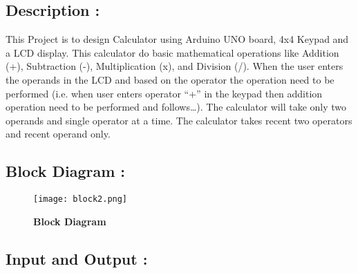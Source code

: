 \documentclass[12pt]{article}
\begin{document}
\subsection*{\textbf{Description :}}
 
 This Project is to design Calculator using Arduino UNO board, 4x4 Keypad and a LCD display. This calculator do basic mathematical operations like Addition (+), Subtraction (-), Multiplication (x), and Division (/). When the user enters the operands in the LCD and based on the operator the operation need to be performed (i.e. when user enters operator “+” in the keypad then addition operation need to be performed and follows…). The calculator will take only two operands and single operator at a time. The calculator takes recent two operators and recent operand only.

 
 \subsection*{\textbf{Block Diagram :}}
 
 \begin{figure}[h]
\centering
\texttt{[image: block2.png]}
\caption{\textbf{Block Diagram}}
\label{block_diagram1}
\end{figure} 
 
 \subsection*{\textbf{Input and Output :}}
 
\end{document}
